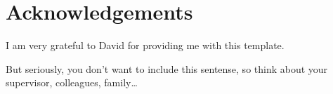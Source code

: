 \chapter*{Acknowledgements}

I am very grateful to David for providing me with this template.

But seriously, you don't want to include this sentense, so think about your supervisor, colleagues, family\dots
\endinput